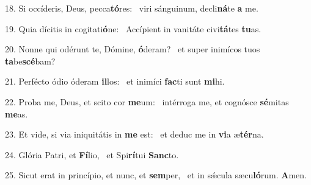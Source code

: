18. Si occíderis, Deus, pecca\textbf{tó}res: \ast\  viri sánguinum, decli\textbf{ná}te \textbf{a} me.\

19. Quia dícitis in cogitati\textbf{ó}ne: \ast\  Accípient in vanitáte civi\textbf{tá}tes \textbf{tu}as.\

20. Nonne qui odérunt te, Dómine, \textbf{ó}deram? \ast\  et super inimícos tuos \textbf{ta}be\textbf{scé}bam?\

21. Perfécto ódio óderam \textbf{il}los: \ast\  et inimíci \textbf{fac}ti sunt \textbf{mi}hi.\

22. Proba me, Deus, et scito cor \textbf{me}um: \ast\  intérroga me, et cognósce \textbf{sé}mitas \textbf{me}as.\

23. Et vide, si via iniquitátis in \textbf{me} est: \ast\  et deduc me in \textbf{vi}a æ\textbf{tér}na.\

24. Glória Patri, et \textbf{Fí}lio, \ast\  et Spi\textbf{rí}tui \textbf{Sanc}to.\

25. Sicut erat in princípio, et nunc, et \textbf{sem}per, \ast\  et in sǽcula sæcu\textbf{ló}rum. \textbf{A}men.\

